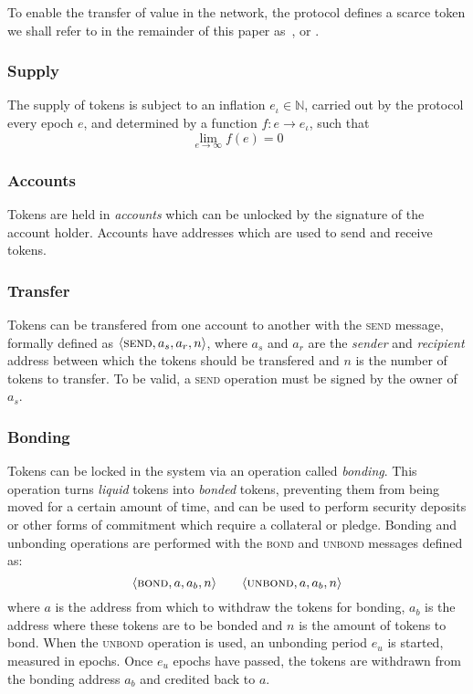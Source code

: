 To enable the transfer of value in the network, the protocol defines a scarce
token we shall refer to in the remainder of this paper as~\token{}, or
\oscoin{}.

\subsubsection{Supply}

The supply of \token{} tokens is subject to an inflation $e_{\iota} \in
\mathbb{N}$, carried out by the protocol every epoch $e$, and determined by a
function $f : e \to e_{\iota}$, such that
\[
    \lim_{e\to\infty} f(e) = 0
\]

\subsubsection{Accounts}

Tokens are held in \emph{accounts} which can be unlocked by the signature of
the account holder. Accounts have addresses which are used to send and receive
tokens.

\subsubsection{Transfer}

Tokens can be transfered from one account to another with the \textsc{send}
message, formally defined as $\langle \textsc{send}, a_{s}, a_{r}, n
\rangle$, where $a_{s}$ and $a_{r}$ are the \emph{sender} and
\emph{recipient} address between which the tokens should be transfered and $n$ is
the number of tokens to transfer. To be valid, a \textsc{send} operation must
be signed by the owner of $a_{s}$.

\subsubsection{Bonding}

Tokens can be locked in the system via an operation called \emph{bonding}.
This operation turns \emph{liquid} tokens into \emph{bonded} tokens, preventing
them from being moved for a certain amount of time, and can be used to perform
security deposits or other forms of commitment which require a collateral or
pledge. Bonding and unbonding operations are performed with the
\textsc{bond} and \textsc{unbond} messages defined as:
\[
    \langle \textsc{bond}, a, a_b, n \rangle \qquad
    \langle \textsc{unbond}, a, a_b, n \rangle
    \medskip
\]
where $a$ is the address from which to withdraw the tokens for bonding, $a_b$
is the address where these tokens are to be bonded and $n$ is the amount of
tokens to bond. When the \textsc{unbond} operation is used, an unbonding period
$e_u$ is started, measured in epochs. Once $e_{u}$ epochs have passed, the
tokens are withdrawn from the bonding address $a_b$ and credited back to $a$.
